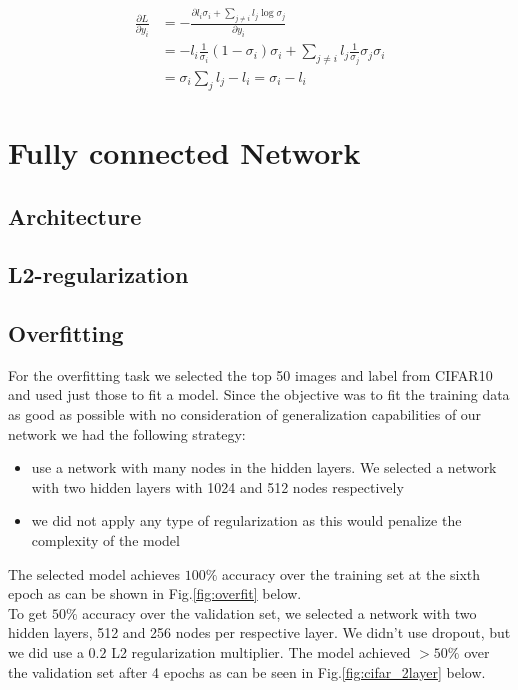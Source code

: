 \documentclass[12pt,twoside]{article}
\begin{document}
\begin{align*}
\frac{\partial L}{\partial y_i} &= -\frac{\partial l_i \sigma_i + \sum_{j \neq i}l_j \log \sigma_j}{\partial y_i}\\
&= - l_i \frac{1}{\sigma_i} (1-\sigma_i) \sigma_i + \sum_{j \neq i} l_j \frac{1}{\sigma_j} \sigma_j \sigma_i \\
&= \sigma_i \sum_j l_j - l_i = \sigma_i - l_i
\end{align*}\section{Fully connected Network}
\subsection{Architecture}
\subsection{L2-regularization}

\subsection{Overfitting}
For the overfitting task we selected the top 50 images and label from CIFAR10 and used just those to fit a model. Since the objective was to fit the training data as good as possible with no consideration of generalization capabilities of our network we had the following strategy:
\begin{itemize}
\item use a network with many nodes in the hidden layers. We selected a network with two hidden layers with 1024 and 512 nodes respectively
\item we did not apply any type of regularization as this would penalize the complexity of the model
\end{itemize}

The selected model achieves $100\%$ accuracy over the training set at the sixth epoch as can be shown in Fig.\ref{fig:overfit} below.
\\

To get $50\%$ accuracy over the validation set, we selected a network with two hidden layers, 512 and 256 nodes per respective layer. We didn't use dropout, but we did use a $0.2$ L2 regularization multiplier. The model achieved $>50\%$ over the validation set after 4 epochs as can be seen in Fig.\ref{fig:cifar_2layer} below. 
\end{document}
